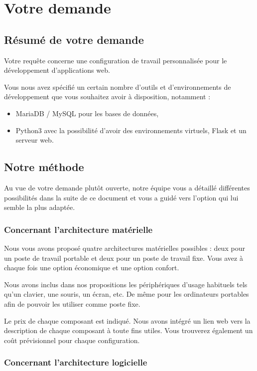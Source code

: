 \chapter{Votre demande}

\section{Résumé de votre demande}

Votre requête concerne une configuration de travail personnalisée pour le développement d'applications web. 

Vous nous avez spécifié un certain nombre d'outils et d'environnements de développement que vous souhaitez avoir à disposition, notamment : 
\begin{itemize}
\item MariaDB / MySQL pour les bases de données, 
\item Python3 avec la possibilité d'avoir des environnements virtuels, Flask et un serveur web.
\end{itemize}

\section{Notre méthode}

Au vue de votre demande plutôt ouverte, notre équipe vous a détaillé différentes possibilités dans la suite de ce document et vous a guidé vers l’option qui lui semble la plus adaptée.

\subsection{Concernant l'architecture matérielle}

Nous vous avons proposé quatre architectures matérielles possibles : deux pour un poste de travail portable et deux pour un poste de travail fixe. Vous avez à chaque fois une option économique et une option confort.

Nous avons inclus dans nos propositions les périphériques d'usage habituels tels qu'un clavier, une souris, un écran, etc. De même pour les ordinateurs portables afin de pouvoir les utiliser comme poste fixe.

Le prix de chaque composant est indiqué. Nous avons intégré un lien web vers la description de chaque composant à toute fins utiles. Vous trouverez également un coût prévisionnel pour chaque configuration.

\subsection{Concernant l'architecture logicielle}

